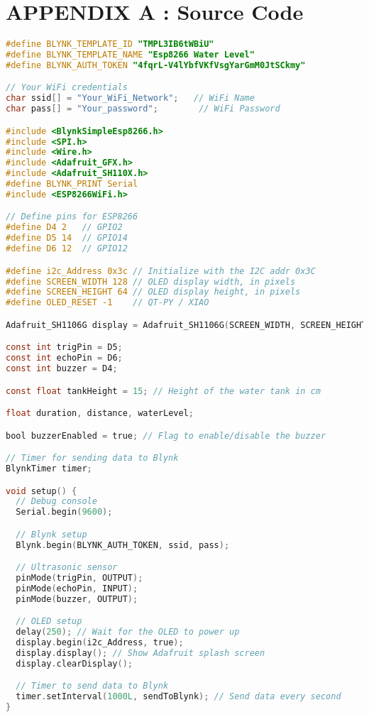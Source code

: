 \section*{APPENDIX A : Source Code}
        
\begin{lstlisting}[language=C]    
#define BLYNK_TEMPLATE_ID "TMPL3IB6tWBiU"
#define BLYNK_TEMPLATE_NAME "Esp8266 Water Level"
#define BLYNK_AUTH_TOKEN "4fqrL-V4lYbfVKfVsgYarGmM0JtSCkmy"

// Your WiFi credentials
char ssid[] = "Your_WiFi_Network";   // WiFi Name
char pass[] = "Your_password";        // WiFi Password

#include <BlynkSimpleEsp8266.h>
#include <SPI.h>
#include <Wire.h>
#include <Adafruit_GFX.h>
#include <Adafruit_SH110X.h>
#define BLYNK_PRINT Serial
#include <ESP8266WiFi.h>

// Define pins for ESP8266
#define D4 2   // GPIO2
#define D5 14  // GPIO14
#define D6 12  // GPIO12

#define i2c_Address 0x3c // Initialize with the I2C addr 0x3C
#define SCREEN_WIDTH 128 // OLED display width, in pixels
#define SCREEN_HEIGHT 64 // OLED display height, in pixels
#define OLED_RESET -1    // QT-PY / XIAO

Adafruit_SH1106G display = Adafruit_SH1106G(SCREEN_WIDTH, SCREEN_HEIGHT, &Wire, OLED_RESET);

const int trigPin = D5;
const int echoPin = D6;
const int buzzer = D4;

const float tankHeight = 15; // Height of the water tank in cm

float duration, distance, waterLevel;

bool buzzerEnabled = true; // Flag to enable/disable the buzzer

// Timer for sending data to Blynk
BlynkTimer timer;

void setup() {
  // Debug console
  Serial.begin(9600);

  // Blynk setup
  Blynk.begin(BLYNK_AUTH_TOKEN, ssid, pass);

  // Ultrasonic sensor
  pinMode(trigPin, OUTPUT);
  pinMode(echoPin, INPUT);
  pinMode(buzzer, OUTPUT);

  // OLED setup
  delay(250); // Wait for the OLED to power up
  display.begin(i2c_Address, true);
  display.display(); // Show Adafruit splash screen
  display.clearDisplay();

  // Timer to send data to Blynk
  timer.setInterval(1000L, sendToBlynk); // Send data every second
}


\end{lstlisting}
